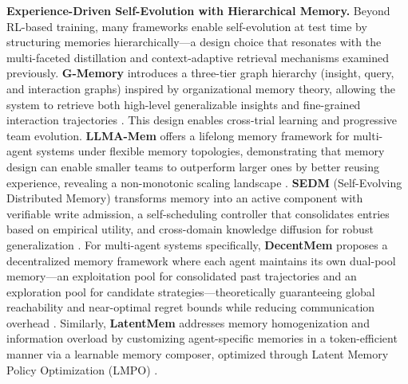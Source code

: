 \documentclass[11pt]{article}
\begin{document}
\textbf{Experience-Driven Self-Evolution with Hierarchical Memory.} Beyond RL-based training, many frameworks enable self-evolution at test time by structuring memories hierarchically---a design choice that resonates with the multi-faceted distillation and context-adaptive retrieval mechanisms examined previously. \textbf{G-Memory} introduces a three-tier graph hierarchy (insight, query, and interaction graphs) inspired by organizational memory theory, allowing the system to retrieve both high-level generalizable insights and fine-grained interaction trajectories \cite{ref118}. This design enables cross-trial learning and progressive team evolution. \textbf{LLMA-Mem} offers a lifelong memory framework for multi-agent systems under flexible memory topologies, demonstrating that memory design can enable smaller teams to outperform larger ones by better reusing experience, revealing a non-monotonic scaling landscape \cite{ref127}. \textbf{SEDM} (Self-Evolving Distributed Memory) transforms memory into an active component with verifiable write admission, a self-scheduling controller that consolidates entries based on empirical utility, and cross-domain knowledge diffusion for robust generalization \cite{ref153}. For multi-agent systems specifically, \textbf{DecentMem} proposes a decentralized memory framework where each agent maintains its own dual-pool memory---an exploitation pool for consolidated past trajectories and an exploration pool for candidate strategies---theoretically guaranteeing global reachability and near-optimal regret bounds while reducing communication overhead \cite{ref154}. Similarly, \textbf{LatentMem} addresses memory homogenization and information overload by customizing agent-specific memories in a token-efficient manner via a learnable memory composer, optimized through Latent Memory Policy Optimization (LMPO) \cite{ref155}.
\end{document}
